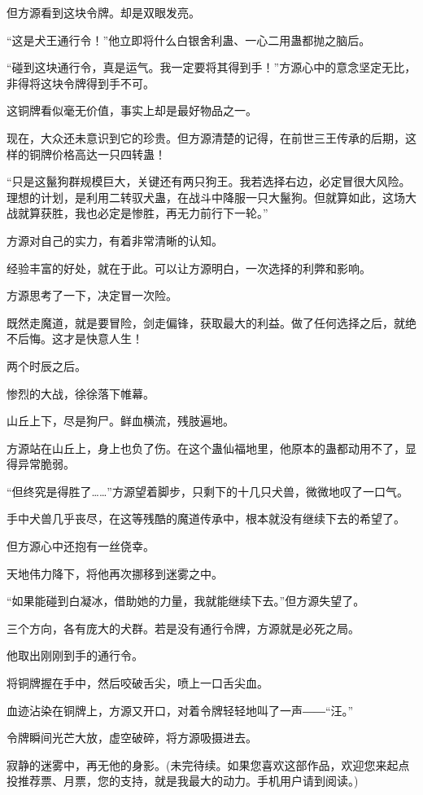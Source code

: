 \begin{this_body}
但方源看到这块令牌。却是双眼发亮。

“这是犬王通行令！”他立即将什么白银舍利蛊、一心二用蛊都抛之脑后。

“碰到这块通行令，真是运气。我一定要将其得到手！”方源心中的意念坚定无比，非得将这块令牌得到手不可。

这铜牌看似毫无价值，事实上却是最好物品之一。

现在，大众还未意识到它的珍贵。但方源清楚的记得，在前世三王传承的后期，这样的铜牌价格高达一只四转蛊！

“只是这鬣狗群规模巨大，关键还有两只狗王。我若选择右边，必定冒很大风险。理想的计划，是利用二转驭犬蛊，在战斗中降服一只大鬣狗。但就算如此，这场大战就算获胜，我也必定是惨胜，再无力前行下一轮。”

方源对自己的实力，有着非常清晰的认知。

经验丰富的好处，就在于此。可以让方源明白，一次选择的利弊和影响。

方源思考了一下，决定冒一次险。

既然走魔道，就是要冒险，剑走偏锋，获取最大的利益。做了任何选择之后，就绝不后悔。这才是快意人生！

两个时辰之后。

惨烈的大战，徐徐落下帷幕。

山丘上下，尽是狗尸。鲜血横流，残肢遍地。

方源站在山丘上，身上也负了伤。在这个蛊仙福地里，他原本的蛊都动用不了，显得异常脆弱。

“但终究是得胜了……”方源望着脚步，只剩下的十几只犬兽，微微地叹了一口气。

手中犬兽几乎丧尽，在这等残酷的魔道传承中，根本就没有继续下去的希望了。

但方源心中还抱有一丝侥幸。

天地伟力降下，将他再次挪移到迷雾之中。

“如果能碰到白凝冰，借助她的力量，我就能继续下去。”但方源失望了。

三个方向，各有庞大的犬群。若是没有通行令牌，方源就是必死之局。

他取出刚刚到手的通行令。

将铜牌握在手中，然后咬破舌尖，喷上一口舌尖血。

血迹沾染在铜牌上，方源又开口，对着令牌轻轻地叫了一声――“汪。”

令牌瞬间光芒大放，虚空破碎，将方源吸摄进去。

寂静的迷雾中，再无他的身影。(未完待续。如果您喜欢这部作品，欢迎您来起点投推荐票、月票，您的支持，就是我最大的动力。手机用户请到阅读。)

\end{this_body}

